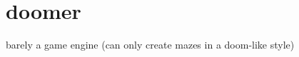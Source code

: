 \chapter{doomer}
\hypertarget{md__2home_2admin_2github_2doomer_2README}{}\label{md__2home_2admin_2github_2doomer_2README}
\label{md__2home_2admin_2github_2doomer_2README_autotoc_md10}%
%
barely a game engine (can only create mazes in a doom-\/like style) 